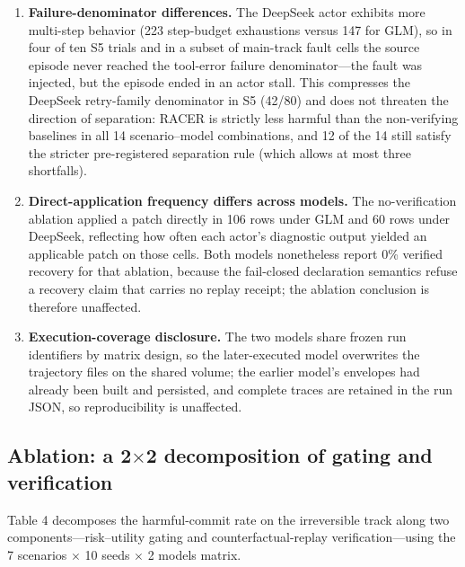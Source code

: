 \documentclass[review]{fcs}
\begin{document}
\begin{enumerate}

  \item \textbf{Failure-denominator differences.} The DeepSeek actor exhibits more multi-step behavior (223 step-budget exhaustions versus 147 for GLM), so in four of ten S5 trials and in a subset of main-track fault cells the source episode never reached the tool-error failure denominator---the fault was injected, but the episode ended in an actor stall. This compresses the DeepSeek retry-family denominator in S5 (42/80) and does not threaten the direction of separation: RACER is strictly less harmful than the non-verifying baselines in all 14 scenario--model combinations, and 12 of the 14 still satisfy the stricter pre-registered separation rule (which allows at most three shortfalls).

  \item \textbf{Direct-application frequency differs across models.} The no-verification ablation applied a patch directly in 106 rows under GLM and 60 rows under DeepSeek, reflecting how often each actor's diagnostic output yielded an applicable patch on those cells. Both models nonetheless report 0\% verified recovery for that ablation, because the fail-closed declaration semantics refuse a recovery claim that carries no replay receipt; the ablation conclusion is therefore unaffected.

  \item \textbf{Execution-coverage disclosure.} The two models share frozen run identifiers by matrix design, so the later-executed model overwrites the trajectory files on the shared volume; the earlier model's envelopes had already been built and persisted, and complete traces are retained in the run JSON, so reproducibility is unaffected.

\end{enumerate}

\subsection{Ablation: a 2$\times$2 decomposition of gating and verification}

Table 4 decomposes the harmful-commit rate on the irreversible track along two components---risk--utility gating and counterfactual-replay verification---using the 7 scenarios $\times$ 10 seeds $\times$ 2 models matrix.
\end{document}
